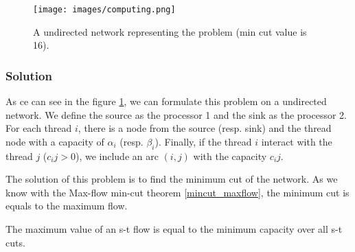 \begin{figure}[H]
\centering
\texttt{[image: images/computing.png]}
\caption{A undirected network representing the problem (min cut value is 16).}
\label{img:computing}
\end{figure}

\subsubsection{Solution}

As ce can see in the figure \ref{img:computing}, we can formulate this problem on a undirected network. We define the source as the processor 1 and the sink as the processor 2. For each thread $i$, there is a node from the source (resp. sink) and the thread node with a capacity of $\alpha_i$ (resp. $\beta_i$). Finally, if the thread $i$ interact with the thread $j$ ($c_ij > 0$), we include an arc $(i, j)$ with the capacity $c_ij$.

The solution of this problem is to find the minimum cut of the network. As we know with the Max-flow min-cut theorem \ref{mincut_maxflow}, the minimum cut is equals to the maximum flow.

\begin{theorem}
\label{mincut_maxflow}
The maximum value of an s-t flow is equal to the minimum capacity over all s-t cuts.
\end{theorem}
